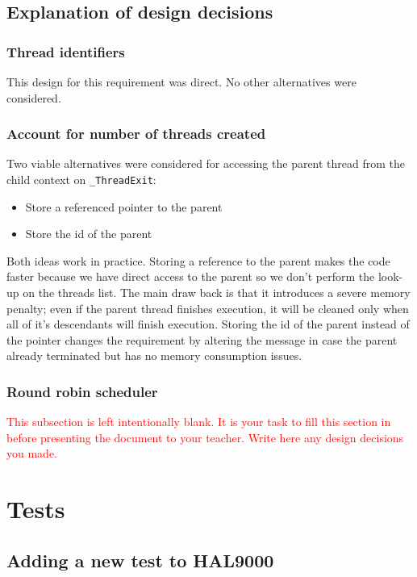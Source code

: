 \documentclass[a4paper,12pt]{report}
\begin{document}
\section{Explanation of design decisions}
 \subsection{Thread identifiers}
 This design for this requirement was direct. No other alternatives were considered.
 
 \subsection{Account for number of threads created} 
 Two viable alternatives were considered for accessing the parent thread from the child context on \lstinline|_ThreadExit|:
 \begin{itemize}
     \item Store a referenced pointer to the parent
     \item Store the id of the parent
 \end{itemize}
 
 Both ideas work in practice. Storing a reference to the parent makes the code faster because we have direct access to the parent so we don't perform the look-up on the threads list. The main draw back is that it introduces a severe memory penalty; even if the parent thread finishes execution, it will be cleaned only when all of it's descendants will finish execution. Storing the id of the parent instead of the pointer changes the requirement by altering the message in case the parent already terminated but has no memory consumption issues.
 
 \subsection{Round robin scheduler}
  \textcolor{red}{This subsection is left intentionally blank. It is your task to fill this section in before presenting the document to your teacher. Write here any design decisions you made.} 
 
  
\chapter{Tests}
\section{Adding a new test to HAL9000}
\end{document}
